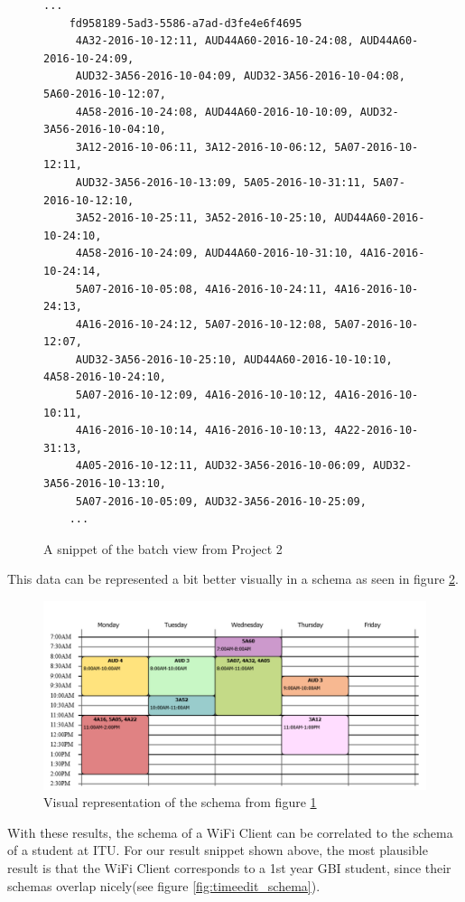 	\begin{figure}[H]
		\begin{lstlisting}[frame=single, backgroundcolor=\color{light-gray}, basicstyle=\footnotesize\ttfamily]
	...
	fd958189-5ad3-5586-a7ad-d3fe4e6f4695	
	 4A32-2016-10-12:11, AUD44A60-2016-10-24:08, AUD44A60-2016-10-24:09, 
	 AUD32-3A56-2016-10-04:09, AUD32-3A56-2016-10-04:08, 5A60-2016-10-12:07, 
	 4A58-2016-10-24:08, AUD44A60-2016-10-10:09, AUD32-3A56-2016-10-04:10, 
	 3A12-2016-10-06:11, 3A12-2016-10-06:12, 5A07-2016-10-12:11, 
	 AUD32-3A56-2016-10-13:09, 5A05-2016-10-31:11, 5A07-2016-10-12:10,
	 3A52-2016-10-25:11, 3A52-2016-10-25:10, AUD44A60-2016-10-24:10,
	 4A58-2016-10-24:09, AUD44A60-2016-10-31:10, 4A16-2016-10-24:14,
	 5A07-2016-10-05:08, 4A16-2016-10-24:11, 4A16-2016-10-24:13,
	 4A16-2016-10-24:12, 5A07-2016-10-12:08, 5A07-2016-10-12:07,
	 AUD32-3A56-2016-10-25:10, AUD44A60-2016-10-10:10, 4A58-2016-10-24:10,
	 5A07-2016-10-12:09, 4A16-2016-10-10:12, 4A16-2016-10-10:11,
	 4A16-2016-10-10:14, 4A16-2016-10-10:13, 4A22-2016-10-31:13,
	 4A05-2016-10-12:11, AUD32-3A56-2016-10-06:09, AUD32-3A56-2016-10-13:10,
	 5A07-2016-10-05:09, AUD32-3A56-2016-10-25:09,
	...
		\end{lstlisting}
		\caption{A snippet of the batch view from Project 2}
		\label{fig:result_data}
	\end{figure}
	
	\newpar This data can be represented a bit better visually in a schema as seen in figure \ref{fig:result_schema}.
	
	\begin{figure}[H]
		\centering
		\includegraphics[width=\linewidth]{figures/schema-from-data.png}
		\caption{Visual representation of the schema from figure \ref{fig:result_data}}
		\label{fig:result_schema}
	\end{figure}
	
	\newpar With these results, the schema of a WiFi Client can be correlated to the schema of a student at ITU. For our result snippet shown above, the most plausible result is that the WiFi Client corresponds to a 1st year GBI student, since their schemas overlap nicely(see figure \ref{fig:timeedit_schema}).
	
